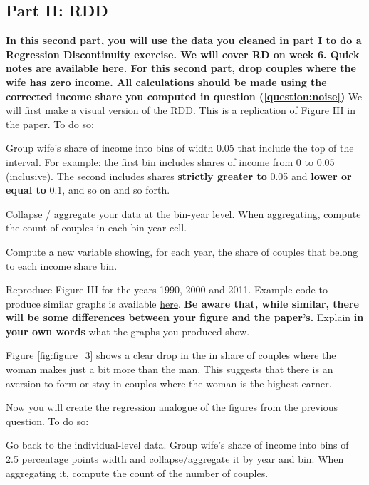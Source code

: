 \documentclass[a4paper, 11pt,addpoints,answers]{exam}
\begin{document}
\begin{questions}
\section*{Part II: RDD}
\noindent \textbf{In this second part, you will use the data you cleaned in part I to do a Regression Discontinuity exercise. We will cover RD on week 6. Quick notes are available \href{https://cesarlgm.github.io/documents/teaching/labour_documents/rdd_notes.pdf}{here}. \newline \newline For this second part, drop couples where the wife has zero income. All calculations should be made using the corrected income share you computed  in question (\ref{question:noise})}
\question[15] We will first make a visual version of the RDD. This is a replication of Figure III in the paper. To do so:
\bitem 
\item Group wife's share of income into bins of width 0.05 that include the top of the interval. For example: the first bin includes shares of income from 0 to 0.05 (inclusive). The second includes shares \textbf{strictly greater to} 0.05 and \textbf{lower or equal to} 0.1, and so on and so forth.
\item Collapse / aggregate your data at the bin-year level. When aggregating, compute the count of couples in each bin-year cell.
\item Compute a new variable showing, for each year, the share of couples that belong to each income share bin.
\item Reproduce Figure III for the years 1990, 2000 and 2011. Example code to produce similar graphs is available \href{https://cesarlgm.github.io/documents/teaching/labour_documents/code_example_lowess.pdf}{here}. \textbf{Be aware that, while similar, there will be some differences between your figure and the paper's.}
\eitem 
Explain \textbf{in your own words} what the graphs you produced show.
\begin{solution}
	Figure \ref{fig:figure_3} shows  a clear drop in the in share of couples where the woman makes just a bit more than the man. This suggests that there is an aversion to form or stay in couples where the woman is the highest earner.
	
\end{solution}
\question[20] Now you will create the regression analogue of the figures from the previous question. To do so:
\label{eq:reg_table}
\bitem 
	\item Go back to the individual-level data. Group wife's share of income into bins of 2.5 percentage points width and collapse/aggregate it by year and bin. When aggregating it, compute the count of the number of couples.

\end{questions}
\end{document}
